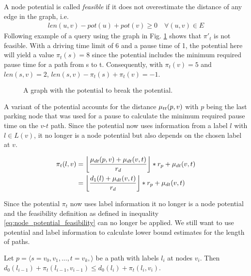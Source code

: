 A node potential is called \emph{feasible} if it does not overestimate the distance of any edge in the graph, i.e.
\begin{align}
	\label{eq:node_potential_feasibility}
	len(u,v) - pot(u) + pot(v) \ge 0 \quad \forall (u,v) \in E
\end{align}
Following example of a query using the graph in Fig. \ref{fig:graph_infeasible_potential} shows that $\pi{'}_t$ is not feasible. With a driving time limit of 6 and a pause time of 1, the potential here will yield a value $\pi_t(s) = 8$ since the potential includes the minimum required pause time for a path from s to t. Consequently, with $\pi_t(v) = 5$ and $len(s,v) = 2$, $len(s,v) - \pi_t(s) + \pi_t(v) = -1$.

\begin{figure}[hbtp]
	\centering
	
	\caption{A graph with the potential to break the potential.}
	\label{fig:graph_infeasible_potential}
\end{figure}

A variant of the potential accounts for the distance $\traveltime(p,v)$ with $p$ being the last parking node that was used for a pause to calculate the minimum required pause time on the $v$-$t$ path. Since the potential now uses information from a label $l$ with $l \in L(v)$, it no longer is a node potential but also depends on the chosen label at $v$.

\begin{align*}
	\pi_t(l,v) & = \floor*{ \frac{\drivingtime(p,v) + \drivingtime(v,t)}{\restr_d} } * \restr_p + \drivingtime(v,t) \\
	           & = \floor*{ \frac{d_1(l) + \drivingtime(v,t)}{\restr_d} } * \restr_p + \drivingtime(v,t)
\end{align*}

Since the potential $\pi_t$ now uses label information it no longer is a node potential and the feasibility definition as defined in inequality \ref{eq:node_potential_feasibility} can no longer be applied. We still want to use potential and label information to calculate lower bound estimates for the length of paths.

\begin{lemma}\label{lemma:pot_labels_get_larger}
	Let $p = \langle s=v_0,v_1,...,t=v_k, \rangle$ be a path with labels $l_i$ at nodes $v_i$. Then $d_0(l_{i-1}) + \pi_t(l_{i-1},v_{i-1}) \le d_0(l_i) + \pi_t(l_i,v_i)$.
\end{lemma}

